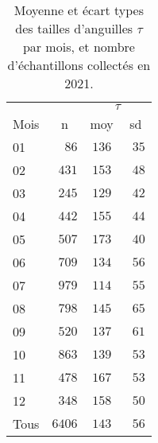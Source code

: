 \begin{table}[htbp]
\begin{center}
\begin{tabular}{lccc}
\hline
 &  & \multicolumn{2}{c}{$\tau$} \\ 
Mois  & n & moy & \multicolumn{1}{c}{sd} \\ 
\hline
01  & $\phantom{00}86$ & $136$ & $\phantom{0}35$ \\
02  & $\phantom{0}431$ & $153$ & $\phantom{0}48$ \\
03  & $\phantom{0}245$ & $129$ & $\phantom{0}42$ \\
04  & $\phantom{0}442$ & $155$ & $\phantom{0}44$ \\
05  & $\phantom{0}507$ & $173$ & $\phantom{0}40$ \\
06  & $\phantom{0}709$ & $134$ & $\phantom{0}56$ \\
07  & $\phantom{0}979$ & $114$ & $\phantom{0}55$ \\
08  & $\phantom{0}798$ & $145$ & $\phantom{0}65$ \\
09  & $\phantom{0}520$ & $137$ & $\phantom{0}61$ \\
10  & $\phantom{0}863$ & $139$ & $\phantom{0}53$ \\
11  & $\phantom{0}478$ & $167$ & $\phantom{0}53$ \\
12  & $\phantom{0}348$ & $158$ & $\phantom{0}50$ \\
Tous  & $6406$ & $143$ & $\phantom{0}56$ \\
\hline 
\end{tabular}
\label{summary_taille_yellow}
\caption{Moyenne et écart types des tailles d'anguilles $\tau$ par mois, et nombre
d'échantillons collectés en 2021.}
\end{center}
\end{table}
